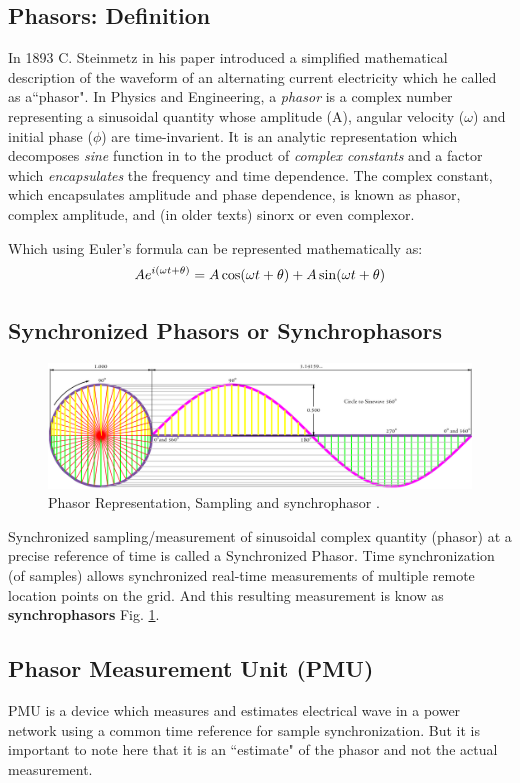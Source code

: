 \subsection{Phasors: Definition}

In 1893 C. Steinmetz in his paper introduced a simplified mathematical description of the waveform of an alternating current electricity which he called as a``phasor". In Physics and Engineering, a \textit{phasor} is a complex number representing a sinusoidal quantity whose amplitude (A), angular velocity ($\omega$) and initial phase ($\phi$) are time-invarient. It is an analytic representation which decomposes \textit{sine} function in to the product of \textit{complex constants} and a factor which \textit{encapsulates} the frequency and time dependence. The complex constant, which encapsulates amplitude and phase dependence, is known as phasor, complex amplitude, and (in older texts) sinorx or even complexor.

Which using Euler's formula can be represented mathematically as:
\begin{equation}\boldmath
Ae^{i(\omega t + \theta)} = A\cos(\omega t + \theta) + A\sin(\omega t + \theta)
\end{equation}

\subsection{Synchronized Phasors or Synchrophasors}
\begin{figure}
	\includegraphics[width=\textwidth]{fig/Circle-To-Sine-Wave.png}
	\caption{Phasor Representation, Sampling and synchrophasor \cite{CirSinWave} .} 
	\label{fig:CirSin}
\end{figure}
 Synchronized sampling/measurement of sinusoidal complex quantity (phasor) at a precise reference of time is called a Synchronized Phasor. Time synchronization (of samples) allows synchronized real-time measurements of multiple remote location points on the grid. And this resulting measurement is know as \textbf{synchrophasors} Fig. \ref{fig:CirSin}.
\subsection{Phasor Measurement Unit (PMU)}
PMU is a device which measures and estimates electrical wave in a power network using a common time reference for sample synchronization. But it is important to note here that it is an ``estimate" of the phasor and not the actual measurement. 

